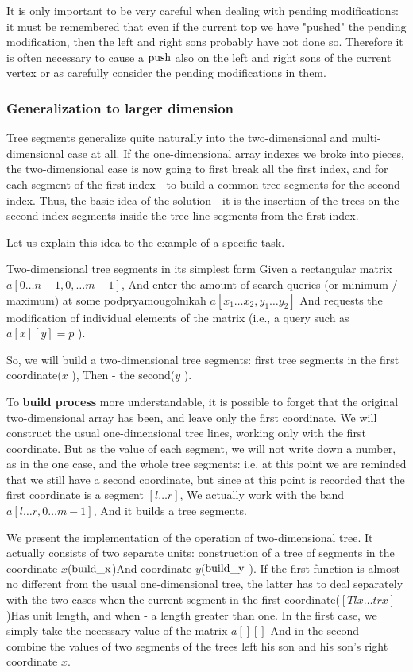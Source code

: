 It is only important to be very careful when dealing with pending modifications: it must be remembered that even if the current top we have "pushed" the pending modification, then the left and right sons probably have not done so. Therefore it is often necessary to cause a $\rm push$ also on the left and right sons of the current vertex or as carefully consider the pending modifications in them.

\subsubsection{ Generalization to larger dimension }

Tree segments generalize quite naturally into the two-dimensional and multi-dimensional case at all. If the one-dimensional array indexes we broke into pieces, the two-dimensional case is now going to first break all the first index, and for each segment of the first index - to build a common tree segments for the second index. Thus, the basic idea of ​​the solution - it is the insertion of the trees on the second index segments inside the tree line segments from the first index.

Let us explain this idea to the example of a specific task.

Two-dimensional tree segments in its simplest form
Given a rectangular matrix $a [0 \ldots n-1, 0, \ldots m-1]$, And enter the amount of search queries (or minimum / maximum) at some podpryamougolnikah $a [x_1 \ldots x_2, y_1 \ldots y_2]$ And requests the modification of individual elements of the matrix (i.e., a query such as $a [x][y] = p$ ).

So, we will build a two-dimensional tree segments: first tree segments in the first coordinate($x$ ), Then - the second($y$ ).

To \textbf{build process} more understandable, it is possible to forget that the original two-dimensional array has been, and leave only the first coordinate. We will construct the usual one-dimensional tree lines, working only with the first coordinate. But as the value of each segment, we will not write down a number, as in the one case, and the whole tree segments: i.e. at this point we are reminded that we still have a second coordinate, but since at this point is recorded that the first coordinate is a segment $[l \ldots r]$, We actually work with the band $a [l \ldots r, 0 \ldots m-1]$, And it builds a tree segments.

We present the implementation of the operation of two-dimensional tree. It actually consists of two separate units: construction of a tree of segments in the coordinate $x$($\rm build \_x$)And coordinate $y$($\rm build \_y$ ). If the first function is almost no different from the usual one-dimensional tree, the latter has to deal separately with the two cases when the current segment in the first coordinate($[Tlx \ldots trx]$)Has unit length, and when - a length greater than one. In the first case, we simply take the necessary value of the matrix $a [][]$ And in the second - combine the values ​​of two segments of the trees left his son and his son's right coordinate $x$.

